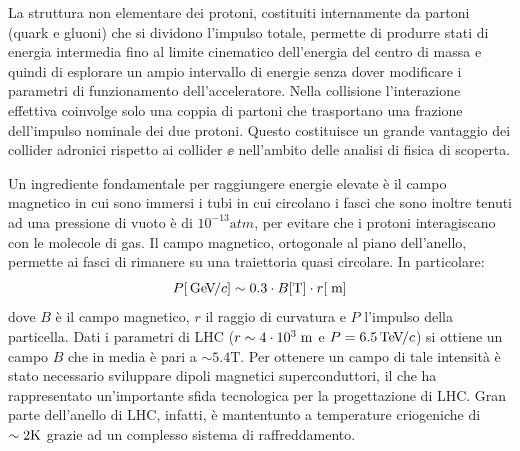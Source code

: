 La struttura non elementare dei protoni, costituiti internamente da partoni (quark e gluoni) che si dividono l'impulso totale, permette di produrre stati di energia intermedia fino al limite cinematico dell'energia del centro di massa e quindi di esplorare un ampio intervallo di energie senza dover modificare i parametri di funzionamento dell'acceleratore. Nella collisione l'interazione effettiva coinvolge solo una coppia di partoni che trasportano una frazione dell'impulso nominale dei due protoni. Questo costituisce un grande vantaggio dei collider adronici rispetto ai collider $\ee$ nell'ambito delle analisi di fisica di scoperta.


Un ingrediente fondamentale per raggiungere energie elevate \`e il campo magnetico in cui sono immersi i tubi in cui circolano i fasci che sono inoltre tenuti ad una pressione di vuoto è di $10^{-13}{\mathrm atm}$, per evitare che i protoni interagiscano con le molecole di gas. Il campo magnetico, ortogonale al piano dell'anello, permette ai fasci di rimanere su una traiettoria quasi circolare. In particolare:
\begin{equation}
P[{\rm \, Ge\kern-0.125em V}\kern-0.125em /c] \sim 0.3 \cdot B[{\mathrm T}] \cdot r[\rm \; m]
\end{equation}
dove $B$ è il campo magnetico, $r$ il raggio di curvatura e $P$ l'impulso della particella. Dati i parametri di LHC ($r\sim4 \cdot 10^3\rm \; m$ e $P=6.5{\rm \, Te\kern-0.125em V}\kern-0.125em /c$) si ottiene un campo $B$ che in media è pari a $\sim 5.4{\mathrm T}$. Per ottenere un campo di tale intensit\`a è stato necessario sviluppare dipoli magnetici superconduttori, il che ha rappresentato un'importante sfida tecnologica per la progettazione di LHC. Gran parte dell'anello di LHC, infatti, \`e mantentunto a temperature criogeniche di $\sim 2{\mathrm K}$ grazie ad un complesso sistema di raffreddamento.

